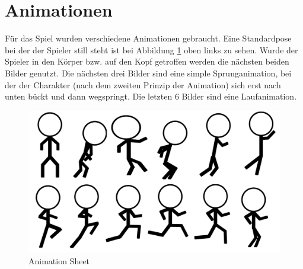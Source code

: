 \section{Animationen}
Für das Spiel wurden verschiedene Animationen gebraucht. Eine Standardpose bei der der Spieler still steht ist bei Abbildung \ref*{AnimationSheet} oben links zu sehen. 
Wurde der Spieler in den Körper bzw. auf den Kopf getroffen werden die nächsten beiden Bilder genutzt. Die nächsten drei Bilder sind eine simple Sprunganimation, bei der der Charakter (nach dem zweiten Prinzip der Animation) sich erst nach unten bückt und dann wegspringt. 
Die letzten 6 Bilder sind eine Laufanimation.
\begin{figure}[H]
    \centering
    \includegraphics[scale=0.3]{pics/AnimationSheet.png}
    \caption{Animation Sheet}
    \label{AnimationSheet}
\end{figure}







